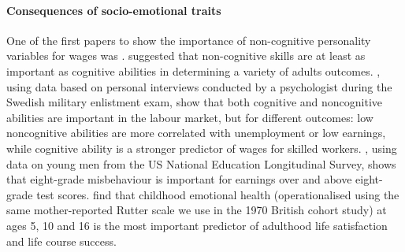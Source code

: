 \paragraph{Consequences of socio-emotional traits} One of the first papers to show the importance of non-cognitive personality variables for wages was \cite{Bowles2001}. \cite{Heckman2006} suggested that non-cognitive skills are at least as important as cognitive abilities in determining a variety of adults outcomes. \citet{Lindqvist2011}, using data based on personal interviews conducted by a psychologist during the Swedish military enlistment exam, show that both cognitive and noncognitive abilities are important in the labour market, but for different outcomes: low noncognitive abilities are more correlated with unemployment or low earnings, while cognitive ability is a stronger predictor of wages for skilled workers. \citet{Segal2013}, using data on young men from the US National Education Longitudinal Survey, shows that eight-grade misbehaviour is important for earnings over and above eight-grade test scores. \citet{Layard2014} find that childhood emotional health (operationalised using the same mother-reported Rutter scale we use in the 1970 British cohort study) at ages 5, 10 and 16 is the most important predictor of adulthood life satisfaction and life course success.

